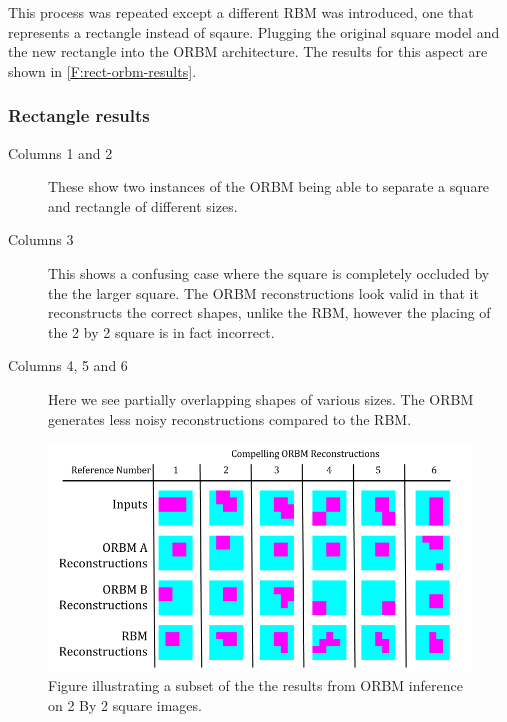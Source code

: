 This process was repeated except a different RBM was introduced, one that represents a rectangle instead of sqaure. Plugging the original square model and the new rectangle into the ORBM architecture. The results for this aspect are shown in \ref{F:rect-orbm-results}.

\subsubsection{Rectangle results}
\begin{description}
  \item[Columns 1 and 2] These show two instances of the ORBM being able to separate a square and rectangle of different sizes.
  \item[Columns 3] This shows a confusing case where the square is completely occluded by the the larger square. The ORBM reconstructions look valid in that it reconstructs the correct shapes, unlike the RBM, however the placing of the 2 by 2 square is in fact incorrect.
  \item[Columns 4, 5 and 6] Here we see partially overlapping shapes of various sizes. The ORBM generates less noisy reconstructions compared to the RBM.
\end{description}




\begin{figure}[htb]
  \begin{center}
    \includegraphics[width=\textwidth]{Assets/results/sq-orbm-results.png}
  \end{center}
  \caption{Figure illustrating a subset of the the results from ORBM inference on 2 By 2 square images.}
  \label{F:sq-orbm-results}
\end{figure}

